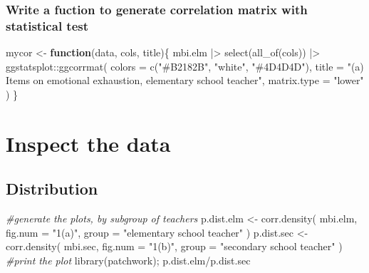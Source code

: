 \documentclass[
]{article}
\newenvironment{Shaded}{\begin{snugshade}}{\end{snugshade}}
\newcommand{\AttributeTok}[1]{\textcolor[rgb]{0.77,0.63,0.00}{#1}}
\newcommand{\CommentTok}[1]{\textcolor[rgb]{0.56,0.35,0.01}{\textit{#1}}}
\newcommand{\ControlFlowTok}[1]{\textcolor[rgb]{0.13,0.29,0.53}{\textbf{#1}}}
\newcommand{\FunctionTok}[1]{\textcolor[rgb]{0.00,0.00,0.00}{#1}}
\newcommand{\NormalTok}[1]{#1}
\newcommand{\OtherTok}[1]{\textcolor[rgb]{0.56,0.35,0.01}{#1}}
\newcommand{\SpecialCharTok}[1]{\textcolor[rgb]{0.00,0.00,0.00}{#1}}
\newcommand{\StringTok}[1]{\textcolor[rgb]{0.31,0.60,0.02}{#1}}
\begin{document}
\hypertarget{write-a-fuction-to-generate-correlation-matrix-with-statistical-test}{%
\subsubsection{Write a fuction to generate correlation matrix with statistical test}\label{write-a-fuction-to-generate-correlation-matrix-with-statistical-test}}

\begin{Shaded}
\begin{Highlighting}[]
\NormalTok{mycor }\OtherTok{\textless{}{-}} 
  \ControlFlowTok{function}\NormalTok{(data, cols, title)\{}
\NormalTok{  mbi.elm }\SpecialCharTok{|\textgreater{}} 
      \FunctionTok{select}\NormalTok{(}\FunctionTok{all\_of}\NormalTok{(cols)) }\SpecialCharTok{|\textgreater{}} 
\NormalTok{      ggstatsplot}\SpecialCharTok{::}\FunctionTok{ggcorrmat}\NormalTok{(}
        \AttributeTok{colors =} \FunctionTok{c}\NormalTok{(}\StringTok{"\#B2182B"}\NormalTok{, }\StringTok{"white"}\NormalTok{, }\StringTok{"\#4D4D4D"}\NormalTok{),}
        \AttributeTok{title =} \StringTok{"(a) Items on emotional exhaustion, }
\StringTok{        elementary school teacher"}\NormalTok{,}
        \AttributeTok{matrix.type  =} \StringTok{"lower"}
\NormalTok{      )}
\NormalTok{    \}}
\end{Highlighting}
\end{Shaded}

\hypertarget{inspect-the-data}{%
\section{Inspect the data}\label{inspect-the-data}}

\hypertarget{distribution}{%
\subsection{Distribution}\label{distribution}}

\begin{Shaded}
\begin{Highlighting}[]
\CommentTok{\#generate the plots, by subgroup of teachers}
\NormalTok{p.dist.elm }\OtherTok{\textless{}{-}} 
  \FunctionTok{corr.density}\NormalTok{(}
\NormalTok{    mbi.elm, }
    \AttributeTok{fig.num =} \StringTok{"1(a)"}\NormalTok{, }
    \AttributeTok{group =} \StringTok{"elementary school teacher"}
\NormalTok{    )}
\NormalTok{p.dist.sec }\OtherTok{\textless{}{-}} 
  \FunctionTok{corr.density}\NormalTok{(}
\NormalTok{    mbi.sec, }
    \AttributeTok{fig.num =} \StringTok{"1(b)"}\NormalTok{,}
    \AttributeTok{group =} \StringTok{"secondary school teacher"}
\NormalTok{    )}
\CommentTok{\#print the plot}
\FunctionTok{library}\NormalTok{(patchwork); p.dist.elm}\SpecialCharTok{/}\NormalTok{p.dist.sec}
\end{Highlighting}
\end{Shaded}
\end{document}
